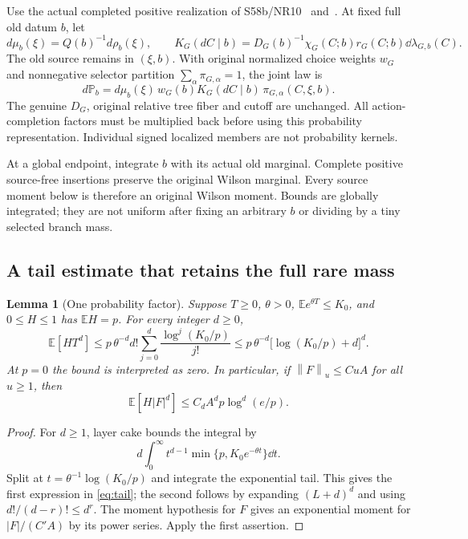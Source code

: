 \documentclass[11pt,letterpaper]{article}
\newtheorem{lemma}[theorem]{Lemma}
\theoremstyle{remark}\newtheorem{remark}[theorem]{Remark}
\newcommand{\E}{\mathbb E}
\newcommand{\norm}[1]{\left\lVert#1\right\rVert}
\begin{document}
Use the actual completed positive realization of S58b/NR10~\cite[pp.~601--602, 1100--1101]{W} and~\cite[\S3]{OS}. At fixed full old datum \(b\), let
\[
 d\mu_b(\xi)=Q(b)^{-1}d\rho_b(\xi),\qquad
 K_G(dC\mid b)=D_G(b)^{-1}\chi_G(C;b)r_G(C;b)\dd\lambda_{G,b}(C).
\]
The old source remains in \((\xi,b)\). With original normalized choice weights \(w_G\) and nonnegative selector partition \(\sum_\alpha\pi_{G,\alpha}=1\), the joint law is
\begin{equation}\label{eq:joint}
 d\mathbb P_b
 =d\mu_b(\xi)\,w_G(b)K_G(dC\mid b)\,
 \pi_{G,\alpha}(C,\xi,b).
\end{equation}
The genuine \(D_G\), original relative tree fiber and cutoff are unchanged. All action-completion factors must be multiplied back before using this probability representation. Individual signed localized members are not probability kernels.

At a global endpoint, integrate \(b\) with its actual old marginal. Complete positive source-free insertions preserve the original Wilson marginal. Every source moment below is therefore an original Wilson moment. Bounds are globally integrated; they are not uniform after fixing an arbitrary \(b\) or dividing by a tiny selected branch mass.

\subsection{A tail estimate that retains the full rare mass}

\begin{lemma}[One probability factor]\label{lem:tail}
Suppose \(T\ge0\), \(\theta>0\), \(\E e^{\theta T}\le K_0\), and \(0\le H\le1\) has \(\E H=p\). For every integer \(d\ge0\),
\begin{equation}\label{eq:tail}
 \E[HT^d]\le
 p\,\theta^{-d}d!\sum_{j=0}^d
 \frac{\log^j(K_0/p)}{j!}
 \le p\,\theta^{-d}\bigl[\log(K_0/p)+d\bigr]^d.
\end{equation}
At \(p=0\) the bound is interpreted as zero. In particular, if
\(\norm{F}_u\le C u A\) for all \(u\ge1\), then
\begin{equation}\label{eq:subexp}
 \E[H|F|^d]\le C_d A^d p\log^d(e/p).
\end{equation}
\end{lemma}
\begin{proof}
For \(d\ge1\), layer cake bounds the integral by
\[
 d\int_0^\infty t^{d-1}\min\{p,K_0e^{-\theta t}\}\dd t.
\]
Split at \(t=\theta^{-1}\log(K_0/p)\) and integrate the exponential tail. This gives the first expression in \eqref{eq:tail}; the second follows by expanding \((L+d)^d\) and using \(d!/(d-r)!\le d^r\). The moment hypothesis for \(F\) gives an exponential moment for \(|F|/(C'A)\) by its power series. Apply the first assertion.
\end{proof}
\end{document}
